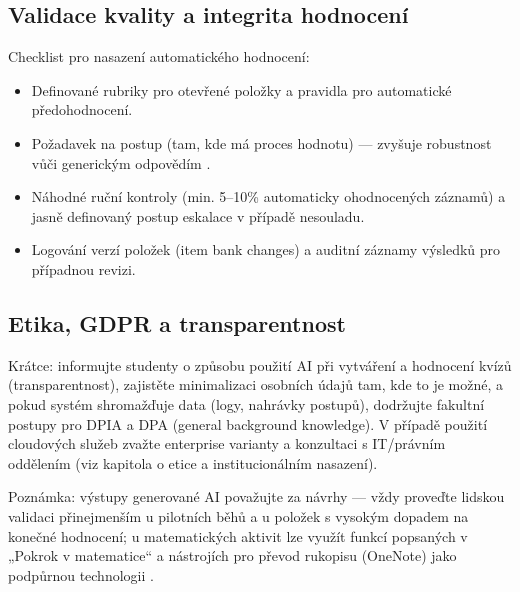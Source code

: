 \subsection*{Validace kvality a integrita hodnocení}
Checklist pro nasazení automatického hodnocení:
\begin{itemize}
  \item Definované rubriky pro otevřené položky a pravidla pro automatické předohodnocení.
  \item Požadavek na postup (tam, kde má proces hodnotu) — zvyšuje robustnost vůči generickým odpovědím \cite{kb_ai_101_tipu_pdf_04e4a115_page_8_1}.
  \item Náhodné ruční kontroly (min. 5–10\% automaticky ohodnocených záznamů) a jasně definovaný postup eskalace v případě nesouladu.
  \item Logování verzí položek (item bank changes) a auditní záznamy výsledků pro případnou revizi.
\end{itemize}

\subsection*{Etika, GDPR a transparentnost}
Krátce: informujte studenty o způsobu použití AI při vytváření a hodnocení kvízů (transparentnost), zajistěte minimalizaci osobních údajů tam, kde to je možné, a pokud systém shromažďuje data (logy, nahrávky postupů), dodržujte fakultní postupy pro DPIA a DPA (general background knowledge). V případě použití cloudových služeb zvažte enterprise varianty a konzultaci s IT/právním oddělením (viz kapitola o etice a institucionálním nasazení).

\medskip
Poznámka: výstupy generované AI považujte za návrhy — vždy proveďte lidskou validaci přinejmenším u pilotních běhů a u položek s vysokým dopadem na konečné hodnocení; u matematických aktivit lze využít funkcí popsaných v „Pokrok v matematice“ a nástrojích pro převod rukopisu (OneNote) jako podpůrnou technologii \cite{kb_ai_101_tipu_pdf_04e4a115_page_8_1}.